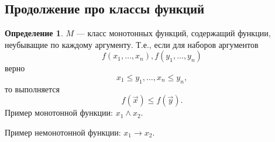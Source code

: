 \documentclass[12pt]{article}
\let\im\rightarrow
\let\la\land
\theoremstyle{definition}
\newtheorem{definition}{Определение}[section]
\theoremstyle{plain}
\theoremstyle{remark}
\begin{document}
\subsection{Продолжение про классы функций}

\begin{definition}
  $M$ --- класс монотонных функций, содержащий функции, неубыващие по
  каждому аргументу. Т.е., если для наборов аргументов
  \begin{displaymath}
    f(x_1, \dots, x_n), f(y_1, \dots, y_n)
  \end{displaymath}
  верно
  \begin{displaymath}
    x_1 \leqslant y_1, \dots, x_n \leqslant y_n,
  \end{displaymath}
  то выполняется
  \begin{displaymath}
    f(\vec{x}) \leqslant f(\vec{y}).
  \end{displaymath}
  Пример монотонной функции: $x_1 \la x_2$.

  Пример немонотонной функции: $x_1 \im x_2$.
\end{definition}
\end{document}
